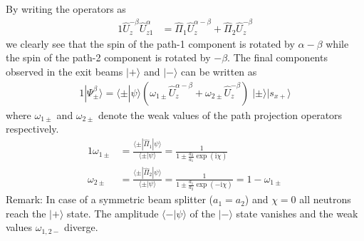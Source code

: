 \documentclass[english,keywords,aps,twocolumn]{revtex4-1}
\newcommand{\im}{\text{i}}
\begin{document}
By writing the operators as 
\begin{alignat}{1}
  \hat U_z^{-\beta} \hat U_{z1}^\alpha &=  
  \hat\Pi_1 \hat U_z^{\alpha-\beta } +
  \hat\Pi_{2} \hat U_z^{-\beta}
\end{alignat}
we clearly see that the spin of the path-1 component is rotated by $\alpha-\beta$ while the spin of the path-2 component is rotated by $-\beta$. The final components observed in the exit beams $|+\rangle$ and $|-\rangle$ can be written as
\begin{alignat}{1}
  |\mathit\Psi_\pm^\beta\rangle =  \langle\pm | \psi\rangle 
  \left( \omega_{1\pm} \hat U_z^{\alpha-\beta } + \omega_{2\pm}  \hat U_z^{-\beta}\right) \; |\pm\rangle | s_{x+}\rangle 
\end{alignat}
where $\omega_{1\pm}$ and $\omega_{2\pm}$ denote the weak values \cite{Aharonov88,Sponar15} of the path projection operators respectively. 
\begin{alignat}{1}
  \omega_{1\pm} &=  \frac{\langle\pm | \hat\Pi_1 | \psi\rangle }{\langle\pm | \psi\rangle } = \frac 1 {1 \pm  \frac {a_2}{a_1} \exp(\im\chi)} \nonumber \\
  \omega_{2\pm} &= \frac{\langle\pm | \hat\Pi_2 | \psi\rangle }{\langle\pm | \psi\rangle } = \frac 1 {1 \pm \frac {a_1}{a_2}\exp(-\im\chi)}  = 1 - \omega_{1\pm} \label{eq:omega}
\end{alignat}
Remark: In case of a symmetric beam splitter ($a_1=a_2$) and $\chi=0$ all neutrons reach the $|+\rangle$ state. The amplitude $\langle - | \psi\rangle$ of the $|-\rangle$ state vanishes and the weak values $\omega_{1,2-}$ diverge. 
\end{document}
